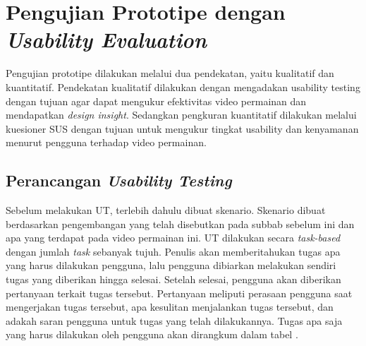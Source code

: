 \section{Pengujian Prototipe dengan \textit{Usability Evaluation}}
Pengujian prototipe dilakukan melalui dua pendekatan, yaitu kualitatif dan kuantitatif. Pendekatan kualitatif dilakukan dengan mengadakan usability testing dengan tujuan agar dapat mengukur efektivitas video permainan dan mendapatkan \textit{design insight}. Sedangkan pengkuran kuantitatif dilakukan melalui kuesioner SUS dengan tujuan untuk mengukur tingkat usability dan kenyamanan menurut pengguna terhadap video permainan.

	\subsection{Perancangan \textit{Usability Testing}}
	Sebelum melakukan UT, terlebih dahulu dibuat skenario. Skenario dibuat berdasarkan pengembangan yang telah disebutkan pada subbab sebelum ini dan apa yang terdapat pada video permainan ini. UT dilakukan secara \textit{task-based} dengan jumlah \textit{task} sebanyak tujuh. Penulis akan memberitahukan tugas apa yang harus dilakukan pengguna, lalu pengguna dibiarkan melakukan sendiri tugas yang diberikan hingga selesai. Setelah selesai, pengguna akan diberikan pertanyaan terkait tugas tersebut. Pertanyaan meliputi perasaan pengguna saat mengerjakan tugas tersebut, apa kesulitan menjalankan tugas tersebut, dan adakah saran pengguna untuk tugas yang telah dilakukannya. Tugas apa saja yang harus dilakukan oleh pengguna akan dirangkum dalam tabel .

